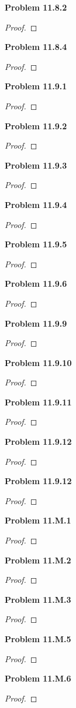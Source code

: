 \documentclass[12pt]{article}
\begin{document}
\textbf{Problem 11.8.2}
\begin{proof}

\end{proof}
\textbf{Problem 11.8.4}
\begin{proof}

\end{proof}
\textbf{Problem 11.9.1}
\begin{proof}

\end{proof}
\textbf{Problem 11.9.2}
\begin{proof}

\end{proof}
\textbf{Problem 11.9.3}
\begin{proof}

\end{proof}
\textbf{Problem 11.9.4}
\begin{proof}

\end{proof}
\textbf{Problem 11.9.5}
\begin{proof}

\end{proof}
\textbf{Problem 11.9.6}
\begin{proof}

\end{proof}
\textbf{Problem 11.9.9}
\begin{proof}

\end{proof}
\textbf{Problem 11.9.10}
\begin{proof}

\end{proof}
\textbf{Problem 11.9.11}
\begin{proof}

\end{proof}
\textbf{Problem 11.9.12}
\begin{proof}

\end{proof}
\textbf{Problem 11.9.12}
\begin{proof}

\end{proof}
\textbf{Problem 11.M.1}
\begin{proof}

\end{proof}
\textbf{Problem 11.M.2}
\begin{proof}

\end{proof}
\textbf{Problem 11.M.3}
\begin{proof}

\end{proof}
\textbf{Problem 11.M.5}
\begin{proof}

\end{proof}
\textbf{Problem 11.M.6}
\begin{proof}

\end{proof}
\end{document}
